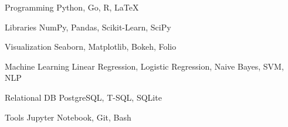 

\begin{cvskills}
	
	\cvskill
	{Programming} %
	{Python, Go, R, LaTeX} %
	
	\cvskill
	{Libraries} %
	{NumPy, Pandas, Scikit-Learn, SciPy} %
	
	\cvskill
	{Visualization} %
	{Seaborn, Matplotlib, Bokeh, Folio} %
	
	\cvskill
	{Machine Learning} %
	{Linear Regression, Logistic Regression, 
		Naive Bayes, SVM, NLP} %
	
	\cvskill
	{Relational DB} %
	{PostgreSQL, T-SQL, SQLite} %
	
	\cvskill
	{Tools} %
	{Jupyter Notebook, Git, Bash} %
	
	
	
\end{cvskills}
